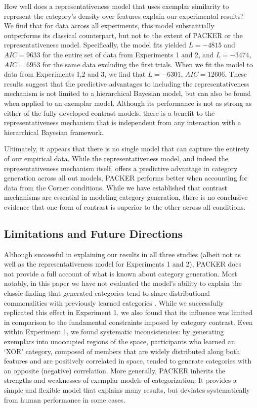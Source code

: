 \documentclass[12pt]{article}
\begin{document}
\begin{flushleft}
How well does a representativeness model that uses exemplar similarity to
represent the category’s density over features explain our experimental results?
We find that for data across all experiments, this model substantially
outperforms its classical counterpart, but not to the extent of PACKER or the
representativeness model. Specifically, the model fits yielded $L = -4815$ and
$AIC=9633$ for the entire set of data from Experiments 1 and 2, and $L = -3474$,
$AIC=6953$ for the same data excluding the first trials. When we fit the model
to data from Experiments 1,2 and 3, we find that $L = -6301$, $AIC = 12606$.
These results suggest that the predictive advantages to including the
representativeness mechanism is not limited to a hierarchical Bayesian model,
but can also be found when applied to an exemplar model. Although its
performance is not as strong as either of the fully-developed contrast models,
there is a benefit to the representativeness mechanism that is independent from
any interaction with a hierarchical Bayesian framework.

Ultimately, it appears that there is no single model that can capture the
entirety of our empirical data. While the representativeness model, and indeed
the representativeness mechanism itself, offers a predictive advantage in
category generation across all out models, PACKER performs better when
accounting for data from the Corner conditions. While we have established that contrast
mechanisms are essential in modeling category generation, there is no conclusive
evidence that one form of contrast is superior to the other across all
conditions. 

\subsection{Limitations and Future Directions} 

Although successful in explaining our results in all three studies (albeit not
as well as the representativeness model for Experiments 1 and 2), PACKER does
not provide a full account of what is known about category generation. Most
notably, in this paper we have not evaluated the model's ability to explain the
classic finding that generated categories tend to share distributional
commonalities with previously learned categories
\citep[see][]{jern2013probabilistic,ward1994structured}. While we successfully
replicated this effect in Experiment 1, we also found that its influence was
limited in comparison to the fundamental constraints imposed by category
contrast. Even within Experiment 1, we found systematic inconsistencies: by
generating exemplars into unoccupied regions of the space, participants who
learned an `XOR' category, composed of members that are widely distributed along
both features and are positively correlated in space, tended to generate
categories with an opposite (negative) correlation. More generally, PACKER
inherits the strengths and weaknesses of exemplar models of categorization: It
provides a simple and flexible model that explains many results, but deviates
systematically from human performance in some cases.


\end{flushleft}
\end{document}
